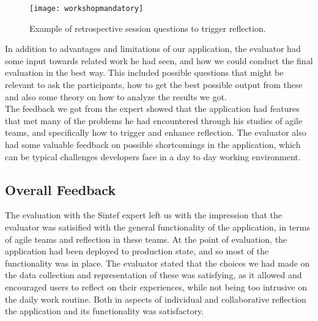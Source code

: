 \begin{figure}[H]
    \centering
        \texttt{[image: workshopmandatory]}
    \caption{Example of retrospective session questions to trigger reflection.}
    \label{workshopmandatoryexpertreview}
\end{figure}

In addition to advantages and limitations of our application, the evaluator had some input towards related work he had seen, and how we could conduct the final evaluation in the best way. This included possible questions that might be relevant to ask the participants, how to get the best possible output from these and also some theory on how to analyze the results we got. \\
The feedback we got from the expert showed that the application had features that met many of the problems he had encountered through his studies of agile teams, and specifically how to trigger and enhance reflection. The evaluator also had some valuable feedback on possible shortcomings in the application, which can be typical challenges developers face in a day to day working environment. 

\subsection{Overall Feedback}
The evaluation with the Sintef expert left us with the impression that the evaluator was satisified with the general functionality of the application, in terms of agile teams and reflection in these teams. 
At the point of evaluation, the application had been deployed to production state, and so most of the functionality was in place. The evaluator stated that the choices we had made on the data collection and representation of these was satisfying, as it allowed and encouraged users to reflect on their experiences, while not being too intrusive on the daily work routine. Both in aspects of individual and collaborative reflection the application and its functionality was satisfactory. \\

